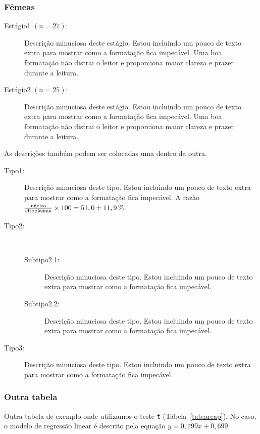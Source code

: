 \subsubsection{Fêmeas}\label{cap3:res:femeas}

\begin{description}
  \item[Estágio1 $(n=27)$:] Descrição minuciosa deste estágio.
    Estou incluindo um pouco de texto extra para mostrar como a formatação fica impecável.
    Uma boa formatação não distrai o leitor e proporciona maior clareza e prazer durante a leitura.
  \item[Estágio2 $(n=25)$:] Descrição minuciosa deste estágio.
    Estou incluindo um pouco de texto extra para mostrar como a formatação fica impecável.
    Uma boa formatação não distrai o leitor e proporciona maior clareza e prazer durante a leitura.
\end{description}

As descrições também podem ser colocadas uma dentro da outra.

\begin{description}
  \item[Tipo1:] Descrição minuciosa deste tipo.
    Estou incluindo um pouco de texto extra para mostrar como a formatação fica impecável.
    A razão $\frac{\text{núcleo}}{\text{citoplasma}}\times100=51,0\pm\unit[11,9]{\%}$.
  \item[Tipo2:] ~
    \begin{description}
      \item[Subtipo2.1:] Descrição minuciosa deste tipo.
	Estou incluindo um pouco de texto extra para mostrar como a formatação fica impecável.
      \item[Subtipo2.2:] Descrição minuciosa deste tipo.
	Estou incluindo um pouco de texto extra para mostrar como a formatação fica impecável.
    \end{description}
  \item[Tipo3:] Descrição minuciosa deste tipo.
	Estou incluindo um pouco de texto extra para mostrar como a formatação fica impecável.
\end{description}

\subsubsection{Outra tabela}\label{cap3:res:morf}

Outra tabela de exemplo onde utilizamos o teste \texttt{t} (Tabela~\ref{tab:areap}).
No caso, o modelo de regressão linear é descrito pela equação $y=0,799x+0,699$.

